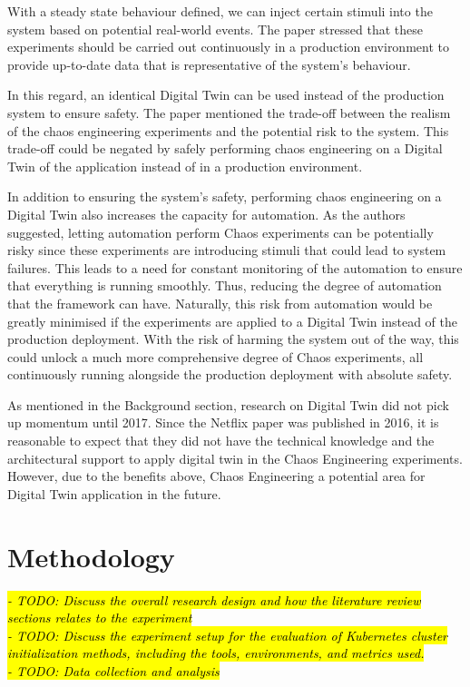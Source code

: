 With a steady state behaviour defined, we can inject certain stimuli into the system based on potential real-world events. The paper stressed that these experiments should be carried out continuously in a production environment to provide up-to-date data that is representative of the system's behaviour.

In this regard, an identical Digital Twin can be used instead of the production system to ensure safety. The paper mentioned the trade-off between the realism of the chaos engineering experiments and the potential risk to the system. This trade-off could be negated by safely performing chaos engineering on a Digital Twin of the application instead of in a production environment.

In addition to ensuring the system's safety, performing chaos engineering on a Digital Twin also increases the capacity for automation. As the authors suggested, letting automation perform Chaos experiments can be potentially risky since these experiments are introducing stimuli that could lead to system failures. This leads to a need for constant monitoring of the automation to ensure that everything is running smoothly. Thus, reducing the degree of automation that the framework can have. Naturally, this risk from automation would be greatly minimised if the experiments are applied to a Digital Twin instead of the production deployment. With the risk of harming the system out of the way, this could unlock a much more comprehensive degree of Chaos experiments, all continuously running alongside the production deployment with absolute safety.

As mentioned in the Background section, research on Digital Twin did not pick up momentum until 2017. Since the Netflix paper was published in 2016, it is reasonable to expect that they did not have the technical knowledge and the architectural support to apply digital twin in the Chaos Engineering experiments. However, due to the benefits above, Chaos Engineering a potential area for Digital Twin application in the future.  


\chapter{Methodology}


\hl{\textit{- TODO: Discuss the overall research design and how the literature review sections relates to the experiment}}    \\
\hl{\textit{- TODO: Discuss the experiment setup for the evaluation of Kubernetes cluster initialization methods, including the tools, environments, and metrics used.}}    \\
\hl{\textit{- TODO: Data collection and analysis}}   \\

